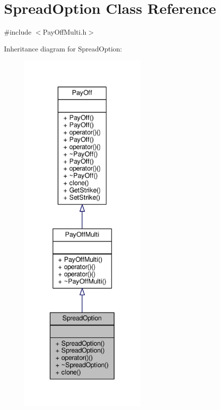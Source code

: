 \hypertarget{classSpreadOption}{}\section{Spread\+Option Class Reference}
\label{classSpreadOption}


{\ttfamily \#include $<$Pay\+Off\+Multi.\+h$>$}



Inheritance diagram for Spread\+Option\+:
\nopagebreak
\begin{figure}[H]
\begin{center}
\leavevmode
\includegraphics[width=177pt]{classSpreadOption__inherit__graph}
\end{center}
\end{figure}


